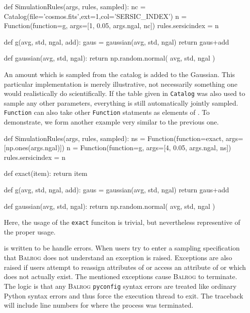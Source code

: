 \documentclass[12pt]{book}
\newcommand{\codett}[1]{\lstinline{#1}}
\newcommand{\py}{Python}
\newcommand{\pyconfig}{\codett{pyconfig}}
\newcommand{\balrog}{\textsc{Balrog}}
\begin{document}
\begin{code}
def SimulationRules(args, rules, sampled):
    nc = Catalog(file='cosmos.fits',ext=1,col='SERSIC_INDEX')
    n = Function(function=g, args=[1, 0.05, args.ngal, nc])
    rules.sersicindex = n

def g(avg, std, ngal, add):
    gaus = gaussian(avg, std, ngal)
    return gaus+add

def gaussian(avg, std, ngal):
    return np.random.normal( avg, std, ngal )
\end{code}

\noindent An amount which is sampled from the catalog is added to the Gaussian.
This particular implementation is merely illustrative, not necessarily
something one would realistically do scientifically.
If the table given in \codett{Catalog} was also used to sample any other parameters,
everything is still automatically jointly sampled.
\codett{Function} can also take other \codett{Function} statments as elements of \simargs{}.
To demonstrate, we form another example very similar to the previous one.

\begin{code}
def SimulationRules(args, rules, sampled):
    ns = Function(function=exact, args=[np.ones(args.ngal)])
    n = Function(function=g, args=[4, 0.05, args.ngal, ns])
    rules.sersicindex = n

def exact(item):
    return item

def g(avg, std, ngal, add):
    gaus = gaussian(avg, std, ngal)
    return gaus+add

def gaussian(avg, std, ngal):
    return np.random.normal( avg, std, ngal )
\end{code}

\noindent Here, the usage of the \codett{exact} funciton is trivial, but nevertheless
representive of the proper usage.

\simfunc{} is written to be handle errors.
When users try to enter a sampling specification that \balrog{} does not understand an exception is raised.
Exceptions are also raised if users attempt to reassign attributes of \simsamp{} or 
access an attribute of \simrules{} or \simsamp{} which does not actually exist.
The mentioned exceptions cause \balrog{} to terminate.
The logic is that any \balrog{} \pyconfig{} syntax errors are treated like ordinary \py{} syntax
errors and thus force the execution thread to exit.
The traceback will include line numbers for where the process was terminated.
\end{document}
